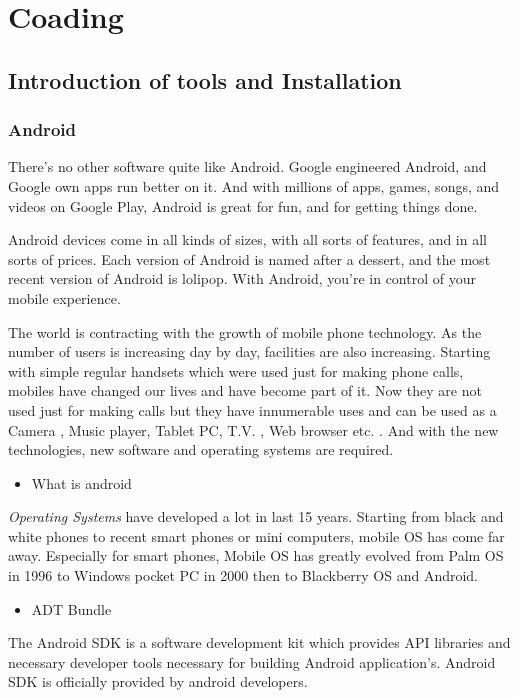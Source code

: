 \chapter{Coading}
\section{Introduction of tools and Installation}
\subsection{Android}

There's no other software quite like Android. Google engineered Android, and Google own apps run better on it. And with millions of apps, games, songs, and videos on Google Play, Android is great for fun, and for getting things done.

Android devices come in all kinds of sizes, with all sorts of features, and in all sorts of prices. Each version of Android is named after a dessert, and the most recent version of Android is lolipop. With Android, you’re in control of your mobile experience.

The world is contracting with the growth of mobile phone technology. As the number of users is increasing day by day, facilities are also increasing. Starting with simple regular handsets which were used just for making phone calls, mobiles have changed our lives and have become part of it. Now they are not used just for making calls but they have innumerable uses and can be used as a Camera , Music player, Tablet PC, T.V. , Web browser etc. . And with the new technologies, new software and operating systems are required.


\begin{itemize}
\item What is android
\end{itemize}

{\em Operating Systems} have developed a lot in last 15 years. Starting from black and white phones to recent smart phones or mini computers, mobile OS has come far away. Especially for smart phones, Mobile OS has greatly evolved from Palm OS in 1996 to Windows pocket PC in 2000 then to Blackberry OS and Android. 

\begin{itemize}
\item ADT Bundle
\end{itemize}

The Android SDK is a software development kit which provides API libraries and necessary developer tools necessary for building Android application’s. Android SDK is officially provided by android developers.

